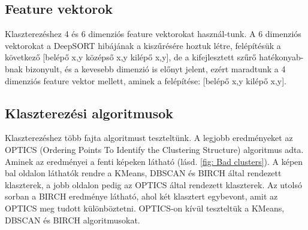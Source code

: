 \documentclass[acmtog, authorversion]{acmart}
\begin{document}
\subsection{Feature vektorok}
Klaszterezéshez 4 és 6 dimenziós feature vektorokat használ-tunk. A 6 dimenziós vektorokat a DeepSORT hibájának a kiszűrésére hoztuk létre, felépítésük a következő [belépő x,y középső x,y kilépő x,y], de a kifejlesztett szűrő hatékonyab-bnak bizonyult, és a kevesebb dimenzió is előnyt jelent, ezért maradtunk a 4 dimenziós feature vektor mellett, aminek a felépítése: [belépő x,y kilépő x,y].
\subsection{Klaszterezési algoritmusok}
Klaszterezéshez több fajta algoritmust teszteltünk. A legjobb eredményeket az OPTICS (Ordering Points To Identify the Clustering Structure) \cite{10.1145/304181.304187} algoritmus adta. 
Aminek az eredményei a fenti képeken látható (lásd. \ref{fig: Bad clusters}). A képen bal oldalon láthatók rendre a KMeans, DBSCAN és BIRCH által rendezett klaszterek, a jobb oldalon pedig az OPTICS által rendezett klaszterek. Az utolsó sorban a BIRCH eredménye látható, ahol két klasztert egybevont, amit az OPTICS meg tudott különböztetni.
OPTICS-on kívül teszteltük a KMeans, DBSCAN és BIRCH algoritmusokat. 
\end{document}
